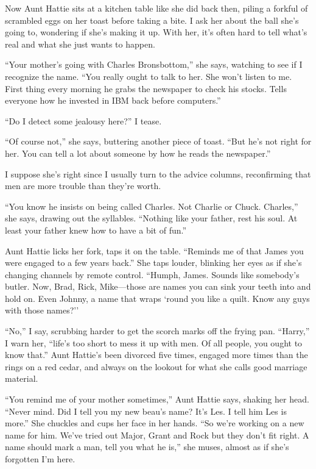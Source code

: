 \documentclass[
]{article}
\begin{document}
Now Aunt Hattie sits at a kitchen table like she did back then, piling a
forkful of scrambled eggs on her toast before taking a bite. I ask her
about the ball she's going to, wondering if she's making it up. With
her, it's often hard to tell what's real and what she just wants to
happen.

``Your mother's going with Charles Bronsbottom,'' she says, watching to
see if I recognize the name. ``You really ought to talk to her. She
won't listen to me. First thing every morning he grabs the newspaper to
check his stocks. Tells everyone how he invested in IBM back before
computers.''

``Do I detect some jealousy here?'' I tease.

``Of course not,'' she says, buttering another piece of toast. ``But
he's not right for her. You can tell a lot about someone by how he reads
the newspaper.''

I suppose she's right since I usually turn to the advice columns,
reconfirming that men are more trouble than they're worth.

``You know he insists on being called Charles. Not Charlie or Chuck.
Charles,'' she says, draw­ing out the syllables. ``Nothing like your
father, rest his soul. At least your father knew how to have a bit of
fun.''

Aunt Hattie licks her fork, taps it on the table. ``Reminds me of that
James you were engaged to a few years back.'' She taps louder, blinking
her eyes as if she's changing channels by remote con­trol. ``Humph,
James. Sounds like somebody's butler. Now, Brad, Rick, Mike---those are
names you can sink your teeth into and hold on. Even Johnny, a name that
wraps `round you like a quilt. Know any guys with those names?''

``No,'' I say, scrubbing harder to get the scorch marks off the frying
pan. ``Harry,'' I warn her, ``life's too short to mess it up with men.
Of all people, you ought to know that.'' Aunt Hattie's been divorced
five times, engaged more times than the rings on a red cedar, and always
on the lookout for what she calls good marriage material.

``You remind me of your mother sometimes,'' Aunt Hattie says, shaking
her head. ``Never mind. Did I tell you my new beau's name? It's Les. I
tell him Les is more.'' She chuckles and cups her face in her hands.
``So we're working on a new name for him. We've tried out Major, Grant
and Rock but they don't fit right. A name should mark a man, tell you
what he is,'' she muses, almost as if she's forgotten I'm here.
\end{document}
